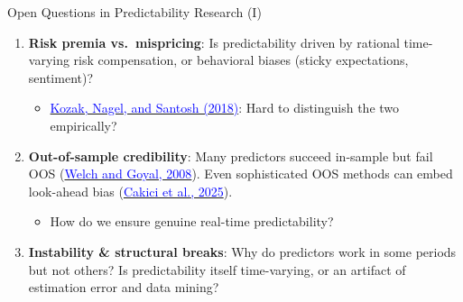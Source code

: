 \documentclass{beamer}
\begin{document}
\begin{frame}{Open Questions in Predictability Research (I)}
	\begin{enumerate}
		\item \textbf{Risk premia vs.\ mispricing}: Is predictability driven by rational time-varying risk compensation, or behavioral biases (sticky expectations, sentiment)?
		\begin{itemize}
			\item \href{https://doi.org/10.1111/jofi.12612}{\textcolor{blue}{Kozak, Nagel, and Santosh (2018)}}: Hard to distinguish the two empirically?
		\end{itemize}

		\vspace{3pt}
		\item \textbf{Out-of-sample credibility}: Many predictors succeed in-sample but fail OOS (\href{https://doi.org/10.1093/rfs/hhm014}{\textcolor{blue}{Welch and Goyal, 2008}}). Even sophisticated OOS methods can embed look-ahead bias (\href{https://doi.org/10.1111/jofi.13484}{\textcolor{blue}{Cakici et al., 2025}}).
		\begin{itemize}
			\item \alert{How do we ensure genuine real-time predictability?}
		\end{itemize}

		\vspace{3pt}
		\item \textbf{Instability \& structural breaks}: Why do predictors work in some periods but not others? Is predictability itself time-varying, or an artifact of estimation error and data mining?
	\end{enumerate}
\end{frame}
\end{document}
